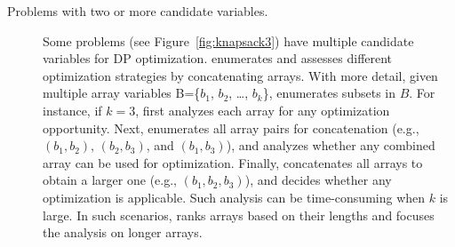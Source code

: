 \begin{description}
		\item[Problems with two or more candidate variables.] 
		Some problems (see Figure~\ref{fig:knapsack3}) have multiple candidate variables for DP optimization. 
		\tool enumerates and assesses different optimization strategies by 
		concatenating arrays. With more detail, given multiple array variables B=\{$b_1$, $b_2$, \ldots, $b_k$\}, \tool enumerates subsets in $B$. For instance, if $k=3$, \tool first analyzes each array for any optimization opportunity. Next, \tool 
enumerates all array pairs for concatenation (e.g., $(b_1, b_2)$, $(b_2, b_3)$, and $(b_1, b_3)$), and analyzes whether any combined array can be used for optimization. Finally, \tool concatenates all arrays to obtain a larger one (e.g., $(b_1, b_2, b_3)$), and decides whether any optimization is applicable. Such analysis can be time-consuming when $k$ is large. In such scenarios, \tool ranks arrays based on their lengths and focuses the analysis on longer  arrays.
	\end{description}

